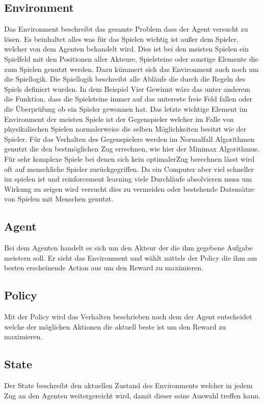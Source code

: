 \subsection{Environment}
Das Environment beschreibt das gesamte Problem dass der Agent versucht zu lösen. Es beinhaltet alles was für das Spielen wichtig ist außer dem Spieler, welcher von dem Agenten behandelt wird.  Dies ist bei den meisten Spielen ein Spielfeld mit den Positionen aller Akteure, Spielsteine oder sonstige Elemente die zum Spielen genutzt werden. Dazu kümmert sich das Environment auch noch um die Spiellogik. Die Spiellogik beschreibt alle Abläufe die durch die Regeln des Spiels definiert wurden. In dem Beispiel Vier Gewinnt wäre das unter anderem die Funktion, dass die Spielsteine immer auf das untereste freie Feld fallen oder die Überprüfung ob ein Spieler gewonnen hat. Das letzte wichtige Element im Environment der meisten Spiele ist der Gegenspieler welcher im Falle von physikalischen Spielen normalerweise die selben Möglichkeiten besitzt wie der Spieler. Für das Verhalten des Gegenspielers werden im Normalfall Algorithmen genutzt die den bestmöglichen Zug errechnen, wie hier der Minimax Algorithmus. Für sehr komplexe Spiele bei denen sich kein optimalerZug berechnen lässt wird oft auf menschliche Spieler zurückgegriffen. Da ein Computer aber viel schneller im spielen ist und reinforcement learning viele Durchläufe absolvieren muss um Wirkung zu zeigen wird versucht dies zu vermeiden oder bestehende Datensätze von Spielen mit Menschen genutzt.\\


\subsection{Agent}
Bei dem Agenten handelt es sich um den Akteur der die ihm gegebene Aufgabe meistern soll. Er sieht das Environment und wählt mittels der Policy die ihm am besten erscheinende Action aus um den Reward zu maximieren.\\

\subsection{Policy}
Mit der Policy wird das Verhalten beschrieben nach dem der Agent entscheidet welche der möglichen Aktionen die aktuell beste ist um den Reward zu maximieren.\\

\subsection{State}
Der State beschreibt den aktuellen Zustand des Environments welcher in jedem Zug  an den Agenten weitergereicht wird, damit dieser seine Auswahl treffen kann. 

